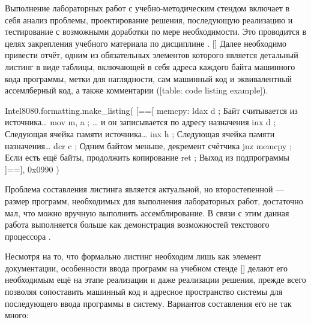 \stopxrow

\stopxtablebody

\stopxtable

\stopexcludedtitle

\stopsectionblock

\startsectionblock[contents]

\completecontent

\stopsectionblock

\startsectionblock[intro]

\starttitle[
    title={Введение},
    reference={title: intro},
]

Выполнение лабораторных работ с учебно-методическим стендом
 включает в себя анализ проблемы, проектирование решения,
последующую реализацию и тестирование с возможными доработки по мере
необходимости. Это проводится в целях закрепления учебного материала по
дисциплине . [] Далее
необходимо привести отчёт, одним из обязательных элементов которого является
детальный листинг в виде таблицы, включающей в себя адреса каждого байта
машинного кода программы, метки для наглядности, сам машинный код и
эквивалентный ассемлберный код, а также комментарии ([table: code
listing example]).

\startplacetable[
    title={Пример листинга},
    reference={table: code listing example},
]

\startluacode
Intel8080.formatting.make_listing(
[==[
memcpy:
ldax d ;  Байт считывается из источника\ldots
mov m, a ; \ldots{} и он записывается по адресу назначения
inx d ; Следующая ячейка памяти источника\ldots
inx h ; Следующая ячейка памяти назначения\ldots
dcr c ; Одним байтом меньше, декремент счётчика
jnz memcpy ; Если есть ещё байты, продолжить копирование
ret ; Выход из подпрограммы
]==], 
0x0990
)
\stopluacode

\stopplacetable

Проблема составления листинга является актуальной, но второстепенной --- размер
программ, необходимых для выполнения лабораторных работ, достаточно мал, что
можно вручную выполнить ассемблирование. В связи с этим данная работа
выполняется больше как демонстрация возможностей текстового процессора
.

Несмотря на то, что формально листинг необходим лишь как элемент документации,
особенности ввода программ на учебном стенде [] делают его
необходимым ещё на этапе реализации и даже реализации решения, прежде всего
позволяя сопоставить машинный код и адресное пространство системы для
последующего ввода программы в систему. Вариантов составления его не так много:


